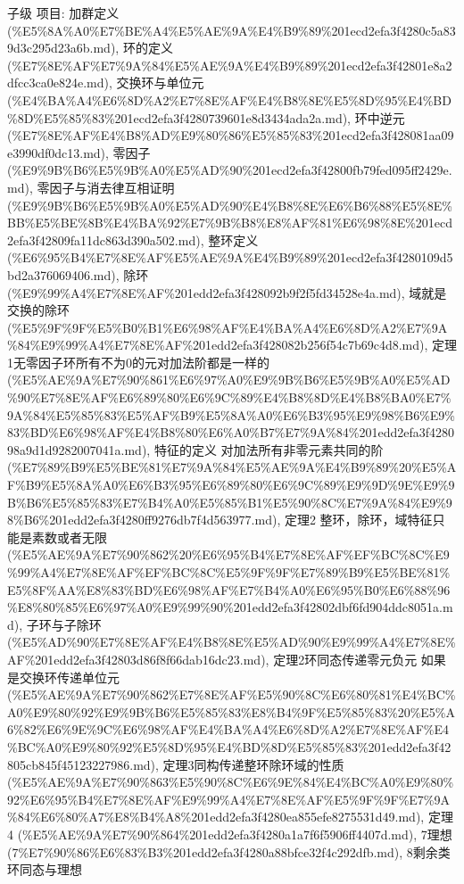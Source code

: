 \begin{note}[第三章]

子级 项目: 加群定义 (\%E5\%8A\%A0\%E7\%BE\%A4\%E5\%AE\%9A\%E4\%B9\%89\%201ecd2efa3f4280c5a839d3c295d23a6b.md), 环的定义 (\%E7\%8E\%AF\%E7\%9A\%84\%E5\%AE\%9A\%E4\%B9\%89\%201ecd2efa3f42801e8a2dfcc3ca0e824e.md), 交换环与单位元 (\%E4\%BA\%A4\%E6\%8D\%A2\%E7\%8E\%AF\%E4\%B8\%8E\%E5\%8D\%95\%E4\%BD\%8D\%E5\%85\%83\%201ecd2efa3f4280739601e8d3434ada2a.md), 环中逆元 (\%E7\%8E\%AF\%E4\%B8\%AD\%E9\%80\%86\%E5\%85\%83\%201ecd2efa3f428081aa09e3990df0dc13.md), 零因子 (\%E9\%9B\%B6\%E5\%9B\%A0\%E5\%AD\%90\%201ecd2efa3f42800fb79fed095ff2429e.md), 零因子与消去律互相证明 (\%E9\%9B\%B6\%E5\%9B\%A0\%E5\%AD\%90\%E4\%B8\%8E\%E6\%B6\%88\%E5\%8E\%BB\%E5\%BE\%8B\%E4\%BA\%92\%E7\%9B\%B8\%E8\%AF\%81\%E6\%98\%8E\%201ecd2efa3f42809fa11dc863d390a502.md), 整环定义 (\%E6\%95\%B4\%E7\%8E\%AF\%E5\%AE\%9A\%E4\%B9\%89\%201ecd2efa3f4280109d5bd2a376069406.md), 除环 (\%E9\%99\%A4\%E7\%8E\%AF\%201edd2efa3f428092b9f2f5fd34528e4a.md), 域就是交换的除环 (\%E5\%9F\%9F\%E5\%B0\%B1\%E6\%98\%AF\%E4\%BA\%A4\%E6\%8D\%A2\%E7\%9A\%84\%E9\%99\%A4\%E7\%8E\%AF\%201edd2efa3f428082b256f54c7b69c4d8.md), 定理1无零因子环所有不为0的元对加法阶都是一样的 (\%E5\%AE\%9A\%E7\%90\%861\%E6\%97\%A0\%E9\%9B\%B6\%E5\%9B\%A0\%E5\%AD\%90\%E7\%8E\%AF\%E6\%89\%80\%E6\%9C\%89\%E4\%B8\%8D\%E4\%B8\%BA0\%E7\%9A\%84\%E5\%85\%83\%E5\%AF\%B9\%E5\%8A\%A0\%E6\%B3\%95\%E9\%98\%B6\%E9\%83\%BD\%E6\%98\%AF\%E4\%B8\%80\%E6\%A0\%B7\%E7\%9A\%84\%201edd2efa3f428098a9d1d9282007041a.md), 特征的定义  对加法所有非零元素共同的阶 (\%E7\%89\%B9\%E5\%BE\%81\%E7\%9A\%84\%E5\%AE\%9A\%E4\%B9\%89\%20\%E5\%AF\%B9\%E5\%8A\%A0\%E6\%B3\%95\%E6\%89\%80\%E6\%9C\%89\%E9\%9D\%9E\%E9\%9B\%B6\%E5\%85\%83\%E7\%B4\%A0\%E5\%85\%B1\%E5\%90\%8C\%E7\%9A\%84\%E9\%98\%B6\%201edd2efa3f4280ff9276db7f4d563977.md), 定理2 整环，除环，域特征只能是素数或者无限 (\%E5\%AE\%9A\%E7\%90\%862\%20\%E6\%95\%B4\%E7\%8E\%AF\%EF\%BC\%8C\%E9\%99\%A4\%E7\%8E\%AF\%EF\%BC\%8C\%E5\%9F\%9F\%E7\%89\%B9\%E5\%BE\%81\%E5\%8F\%AA\%E8\%83\%BD\%E6\%98\%AF\%E7\%B4\%A0\%E6\%95\%B0\%E6\%88\%96\%E8\%80\%85\%E6\%97\%A0\%E9\%99\%90\%201edd2efa3f42802dbf6fd904ddc8051a.md), 子环与子除环 (\%E5\%AD\%90\%E7\%8E\%AF\%E4\%B8\%8E\%E5\%AD\%90\%E9\%99\%A4\%E7\%8E\%AF\%201edd2efa3f42803d86f8f66dab16dc23.md), 定理2环同态传递零元负元 如果是交换环传递单位元 (\%E5\%AE\%9A\%E7\%90\%862\%E7\%8E\%AF\%E5\%90\%8C\%E6\%80\%81\%E4\%BC\%A0\%E9\%80\%92\%E9\%9B\%B6\%E5\%85\%83\%E8\%B4\%9F\%E5\%85\%83\%20\%E5\%A6\%82\%E6\%9E\%9C\%E6\%98\%AF\%E4\%BA\%A4\%E6\%8D\%A2\%E7\%8E\%AF\%E4\%BC\%A0\%E9\%80\%92\%E5\%8D\%95\%E4\%BD\%8D\%E5\%85\%83\%201edd2efa3f42805cb845f45123227986.md), 定理3同构传递整环除环域的性质 (\%E5\%AE\%9A\%E7\%90\%863\%E5\%90\%8C\%E6\%9E\%84\%E4\%BC\%A0\%E9\%80\%92\%E6\%95\%B4\%E7\%8E\%AF\%E9\%99\%A4\%E7\%8E\%AF\%E5\%9F\%9F\%E7\%9A\%84\%E6\%80\%A7\%E8\%B4\%A8\%201edd2efa3f4280ea855efe8275531d49.md), 定理4 (\%E5\%AE\%9A\%E7\%90\%864\%201edd2efa3f4280a1a7f6f5906ff4407d.md), 7理想 (7\%E7\%90\%86\%E6\%83\%B3\%201edd2efa3f4280a88bfce32f4c292dfb.md), 8剩余类环同态与理想 
\end{note}
